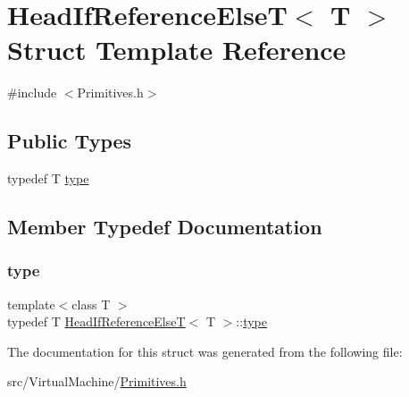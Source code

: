 \hypertarget{struct_head_if_reference_else_t_3_01_t_01_4}{}\section{Head\+If\+Reference\+ElseT$<$ T $>$ Struct Template Reference}
\label{struct_head_if_reference_else_t_3_01_t_01_4}


{\ttfamily \#include $<$Primitives.\+h$>$}

\subsection*{Public Types}
\begin{DoxyCompactItemize}
\item 
typedef T \hyperlink{struct_head_if_reference_else_t_3_01_t_01_4_ad4fabe2100fa4371e776a7ad1f75a46e}{type}
\end{DoxyCompactItemize}


\subsection{Member Typedef Documentation}
\mbox{\label{struct_head_if_reference_else_t_3_01_t_01_4_ad4fabe2100fa4371e776a7ad1f75a46e}} 
\subsubsection{\texorpdfstring{type}{type}}
{\footnotesize\ttfamily template$<$class T $>$ \\
typedef T \hyperlink{struct_head_if_reference_else_t}{Head\+If\+Reference\+ElseT}$<$ T $>$\+::\hyperlink{struct_head_if_reference_else_t_3_01_t_01_4_ad4fabe2100fa4371e776a7ad1f75a46e}{type}}



The documentation for this struct was generated from the following file\+:\begin{DoxyCompactItemize}
\item 
src/\+Virtual\+Machine/\hyperlink{_primitives_8h}{Primitives.\+h}\end{DoxyCompactItemize}
